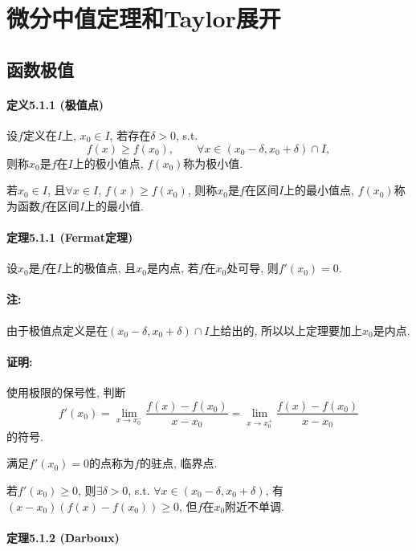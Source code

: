 \section{微分中值定理和Taylor展开}
\subsection{函数极值}

\paragraph{定义5.1.1 (极值点)}

设$f$定义在$I$上, $x_{0}\in I$, 若存在$\delta>0$, s.t.
\[
f(x)\ge f(x_{0}),\qquad\forall x\in(x_{0}-\delta,x_{0}+\delta)\cap I,
\]
则称$x_{0}$是$f$在$I$上的极小值点, $f(x_{0})$称为极小值.

若$x_{0}\in I$, 且$\forall x\in I$, $f(x)\ge f(x_{0})$, 则称$x_{0}$是$f$在区间$I$上的最小值点,
$f(x_{0})$称为函数$f$在区间$I$上的最小值.

\paragraph{定理5.1.1 (Fermat定理)}

设$x_{0}$是$f$在$I$上的极值点, 且$x_{0}$是内点, 若$f$在$x_{0}$处可导, 则$f'(x_{0})=0$.

\paragraph{注:}

由于极值点定义是在$(x_{0}-\delta,x_{0}+\delta)\cap I$上给出的, 所以以上定理要加上$x_{0}$是内点.

\paragraph{证明:}

使用极限的保号性, 判断
\[
f'(x_{0})=\lim_{x\to x_{0}^{-}}\frac{f(x)-f(x_{0})}{x-x_{0}}=\lim_{x\to x_{0}^{+}}\frac{f(x)-f(x_{0})}{x-x_{0}}
\]
的符号.

满足$f'(x_{0})=0$的点称为$f$的驻点, 临界点.

若$f'(x_{0})\ge0$, 则$\exists\delta>0$, s.t. $\forall x\in(x_{0}-\delta,x_{0}+\delta)$,
有$(x-x_{0})(f(x)-f(x_{0}))\ge0$, 但$f$在$x_{0}$附近不单调.

\paragraph{定理5.1.2 (Darboux)}

